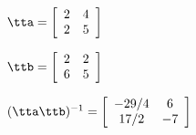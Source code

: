 {$\tta = \left[
\begin{array}{cc}
  2 & 4 \\
 2 & 5
\end{array}\right]$
 
$\ttb = \left[
\begin{array}{cc}
  2 & 2 \\
  6 & 5
\end{array}
\right]$}
{$(\tta\ttb)^{-1} = \left[
\begin{array}{cc}
 -29/4 & 6\\
 17/2 & -7
\end{array}
\right]$}
